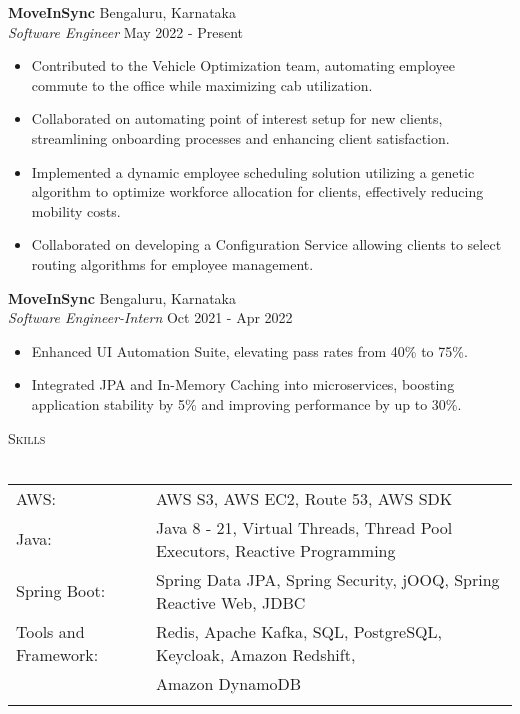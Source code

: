 \documentclass[a4paper]{article}
\newcommand{\lineunder} {
    \vspace*{-8pt} \\
    \hspace*{-18pt} \hrulefill \\
}
\newcommand{\header} [1] {
    {\hspace*{-18pt}\vspace*{6pt} \textsc{#1}}
    \vspace*{-6pt} \lineunder
}
\begin{document}
\textbf{MoveInSync} \hfill Bengaluru, Karnataka\\
\textit{Software Engineer} \hfill May 2022 - Present\\
\vspace{-1mm}
\begin{itemize} \itemsep 1pt
	\item Contributed to the Vehicle Optimization team, automating employee commute to the office while maximizing cab utilization.
	\item Collaborated on automating point of interest setup for new clients, streamlining onboarding processes and enhancing client satisfaction.
	\item Implemented a dynamic employee scheduling solution utilizing a genetic algorithm to optimize workforce allocation for clients, effectively reducing mobility costs.
	\item Collaborated on developing a Configuration Service allowing clients to select routing algorithms for employee management.
\end{itemize}
\textbf{MoveInSync} \hfill Bengaluru, Karnataka\\
\textit{Software Engineer-Intern} \hfill Oct 2021 - Apr 2022\\
\vspace{-1mm}
\begin{itemize} \itemsep 1pt
	\item Enhanced UI Automation Suite, elevating pass rates from 40\% to 75\%.
	\item Integrated JPA and In-Memory Caching into microservices, boosting application stability by 5\% and improving performance by up to 30\%.
\end{itemize}

\header{Skills}
\begin{tabular}{ l l }
	AWS:                  & AWS S3, AWS EC2, Route 53, AWS SDK                                            \\
	Java:                 & Java 8 - 21, Virtual Threads, Thread Pool Executors, Reactive Programming \\
	Spring Boot:          & Spring Data JPA, Spring Security, jOOQ, Spring Reactive Web, JDBC         \\
    Tools and Framework:   & Redis, Apache Kafka, SQL, PostgreSQL, Keycloak, Amazon Redshift, \\& Amazon DynamoDB \\         \\
\end{tabular}
\vspace{2mm}
\end{document}
